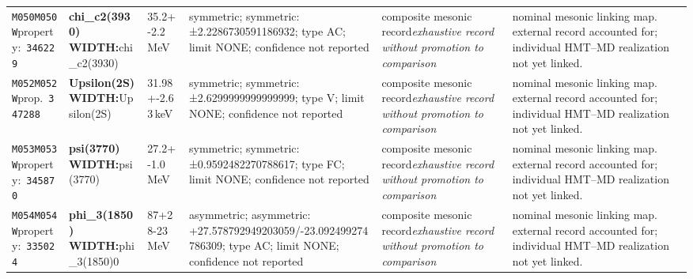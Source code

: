 \begin{landscape}
\begin{longtable}{L{1.85cm}L{4.45cm}L{2.35cm}L{4.05cm}L{3.35cm}L{7.15cm}}
\texttt{M050}\newline \texttt{M050W}\newline property:\ \texttt{346229} & \textbf{chi\_\allowbreak{}c2(3930) WIDTH:}\newline chi\_\allowbreak{}c2(3930) & 35.2+-2.2\,MeV & symmetric; symmetric: ±2.2286730591186932; type AC; limit NONE; confidence not reported & composite mesonic record\newline \emph{exhaustive record without promotion to comparison} & nominal mesonic linking map. external record accounted for; individual HMT--MD realization not yet linked. \\
\texttt{M052}\newline \texttt{M052W}\newline prop.\ \texttt{347288} & \textbf{Upsilon(2S) WIDTH:}\newline Upsilon(2S) & 31.98+-2.63\,keV & symmetric; symmetric: ±2.6299999999999999; type V; limit NONE; confidence not reported & composite mesonic record\newline \emph{exhaustive record without promotion to comparison} & nominal mesonic linking map. external record accounted for; individual HMT--MD realization not yet linked. \\
\texttt{M053}\newline \texttt{M053W}\newline property:\ \texttt{345870} & \textbf{psi(3770) WIDTH:}\newline psi(3770) & 27.2+-1.0\,MeV & symmetric; symmetric: ±0.9592482270788617; type FC; limit NONE; confidence not reported & composite mesonic record\newline \emph{exhaustive record without promotion to comparison} & nominal mesonic linking map. external record accounted for; individual HMT--MD realization not yet linked. \\
\texttt{M054}\newline \texttt{M054W}\newline property:\ \texttt{335024} & \textbf{phi\_\allowbreak{}3(1850) WIDTH:}\newline phi\_\allowbreak{}3(1850)0 & 87+28-23\,MeV & asymmetric; asymmetric: +27.578792949203059/-23.092499274786309; type AC; limit NONE; confidence not reported & composite mesonic record\newline \emph{exhaustive record without promotion to comparison} & nominal mesonic linking map. external record accounted for; individual HMT--MD realization not yet linked. \\

\end{longtable}
\end{landscape}
